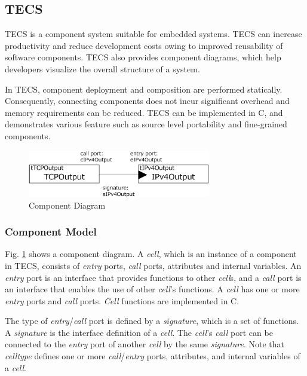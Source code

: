 \documentclass[conference]{IEEEtran/IEEEtran}
\begin{document}
\subsection{TECS}
\label{sec:TECS}

TECS is a component system suitable for embedded systems.
TECS can increase productivity and reduce development costs owing to improved reusability of software components.
TECS also provides component diagrams, which help developers visualize the overall structure of a system.

In TECS, component deployment and composition are performed statically.
Consequently, connecting components does not incur significant overhead and memory requirements can be reduced.
TECS can be implemented in C, and demonstrates various feature such as source level portability and fine-grained components.

\begin{figure}[t]
    \centering
    \includegraphics[width=8.0cm,clip]{figure/ComponentDiagram.pdf}
    \caption{Component Diagram}
    \label{fig:ComponentDiagram}
\end{figure}

\subsubsection{Component Model}

Fig. \ref{fig:ComponentDiagram} shows a component diagram.
A {\it cell}, which is an instance of a component in TECS, consists of {\it entry} ports, {\it call} ports, attributes and internal variables.
An {\it entry} port is an interface that provides functions to other {\it cell}s, and a {\it call} port is an interface that enables the use of other {\it cell}'s functions.
A {\it cell} has one or more {\it entry} ports and {\it call} ports.
{\it Cell} functions are implemented in C.

The type of {\it entry}/{\it call} port is defined by a {\it signature}, which is a set of functions.
A {\it signature} is the interface definition of a {\it cell}.
The {\it cell}'s  {\it call} port can be connected to the {\it entry} port of another {\it cell} by the same {\it signature}.
Note that {\it celltype} defines one or more {\it call}/{\it entry} ports, attributes, and internal variables of a {\it cell}.
\end{document}
